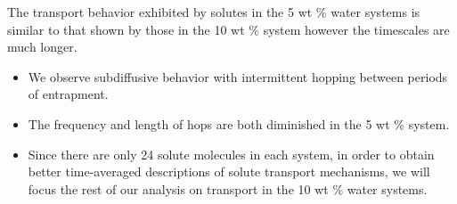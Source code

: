 \documentclass{article}
\begin{document}
%  
%
  
  \noindent The transport behavior exhibited by solutes in the 5 wt \% water systems
  is similar to that shown by those in the 10 wt \% system however the timescales are
  much longer.
  \begin{itemize}
    \item We observe subdiffusive behavior with intermittent hopping between
    periods of entrapment.
    \item The frequency and length of hops are both diminished in the 5 wt \% system.
    \item Since there are only 24 solute molecules in each system, in order to obtain
    better time-averaged descriptions of solute transport mechanisms, we will focus
    the rest of our analysis on transport in the 10 wt \% water systems.
  \end{itemize}
  
  
\end{document}
